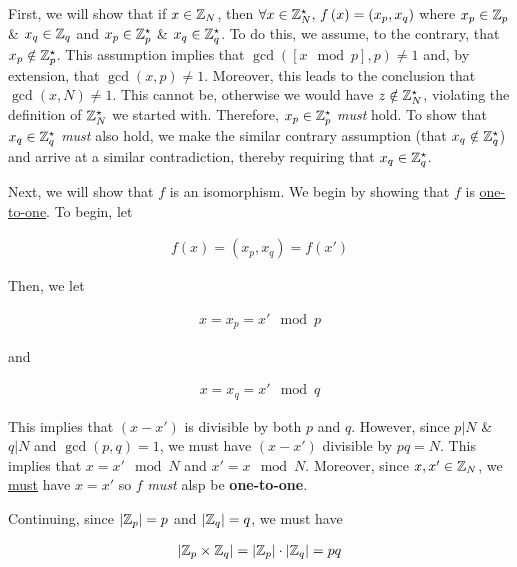\documentclass[../CryptoHW3.tex]{subfiles}
\begin{document}
\begin{flushleft}



  First, we will show that if $x \in \mathbb{Z}_N$, then $\forall x \in \mathbb{Z}_N^\star, \, f \left( x \right) = \left( x_p, x_q \right)$ where $x_p \in \mathbb{Z}_p$ \& $x_q \in \mathbb{Z}_q$ and $x_p \in \mathbb{Z}_p^\star$ \& $x_q \in \mathbb{Z}_q^\star$.  To do this, we assume, to the contrary, that $x_p \notin \mathbb{Z}_p^\star$.  This assumption implies that $\gcd \left( \left[ x \mod p \right], p \right) \neq 1$ and, by extension, that $\gcd \left( x, p \right) \neq 1$.  Moreover, this leads to the conclusion that $\gcd \left( x, N \right) \neq 1$.  This cannot be, otherwise we would have $z \notin \mathbb{Z}_N^\star$, violating the definition of $\mathbb{Z}_N^\star$ we started with.  Therefore, $x_p \in \mathbb{Z}_p^\star$ \emph{must} hold.  To show that $x_q \in \mathbb{Z}_q^\star$ \emph{must} also hold, we make the similar contrary assumption (that $x_q \notin \mathbb{Z}_q^\star$) and arrive at a similar contradiction, thereby requiring that $x_q \in \mathbb{Z}_q^\star$. \newline

Next, we will show that $f$ is an isomorphism.  We begin by showing that $f$ is \underline{one-to-one}.  To begin, let

\begin{align*}
  f \left( x \right) = \left( x_p, x_q \right) = f \left( x' \right)
\end{align*}

Then, we let

\begin{align*}
  x = x_p = x' \mod p
\end{align*}

and

\begin{align*}
  x = x_q = x' \mod q
\end{align*}

This implies that $\left( x - x' \right)$ is divisible by both $p$ and $q$.  However, since $p \vert N$ \& $q \vert N$ and $\gcd \left( p, q \right) = 1$, we must have $\left( x - x' \right)$ divisible by $p q = N$.  This implies that $x = x' \mod N$ and $x' = x \mod N$.  Moreover, since $x, x' \in \mathbb{Z}_N$, we \underline{must} have $x = x'$ so $f$ \emph{must} alsp be \textbf{one-to-one}. \newline

Continuing, since $\left| \mathbb{Z}_p \right| = p$ and $\left| \mathbb{Z}_q \right| = q$, we must have

\begin{align}
  \left| \mathbb{Z}_p \times \mathbb{Z}_q \right| = \left| \mathbb{Z}_p \right| \cdot \left| \mathbb{Z}_q \right| = p q \label{eq5a}
\end{align}


\end{flushleft}
\end{document}
